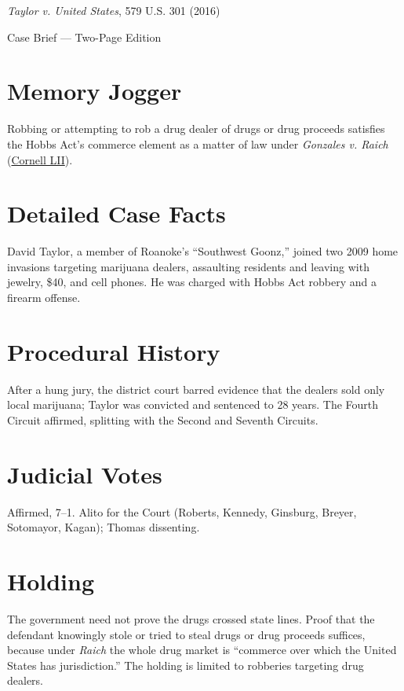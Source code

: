 \documentclass[12pt]{article}
\begin{document}
\begin{center}
{\LARGE \textit{Taylor v. United States}, 579 U.S. 301 (2016)\par}
\vspace{0.5em}
{\large Case Brief --- Two-Page Edition\par}
\end{center}

\section{Memory Jogger}
Robbing or attempting to rob a drug dealer of drugs or drug proceeds satisfies the Hobbs Act's commerce element as a matter of law under \textit{Gonzales v. Raich} (\href{https://www.law.cornell.edu/supremecourt/text/14-6166}{Cornell LII}).

\section{Detailed Case Facts}
David Taylor, a member of Roanoke's ``Southwest Goonz,'' joined two 2009 home invasions targeting marijuana dealers, assaulting residents and leaving with jewelry, \$40, and cell phones. He was charged with Hobbs Act robbery and a firearm offense.

\section{Procedural History}
After a hung jury, the district court barred evidence that the dealers sold only local marijuana; Taylor was convicted and sentenced to 28 years. The Fourth Circuit affirmed, splitting with the Second and Seventh Circuits.

\section{Judicial Votes}
Affirmed, 7--1. Alito for the Court (Roberts, Kennedy, Ginsburg, Breyer, Sotomayor, Kagan); Thomas dissenting.

\section{Holding}
The government need not prove the drugs crossed state lines. Proof that the defendant knowingly stole or tried to steal drugs or drug proceeds suffices, because under \textit{Raich} the whole drug market is ``commerce over which the United States has jurisdiction.'' The holding is limited to robberies targeting drug dealers.
\end{document}
